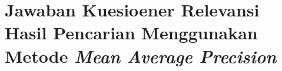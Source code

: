 
\chapter{Jawaban Kuesioener Relevansi Hasil Pencarian Menggunakan Metode \emph{Mean Average Precision}}

